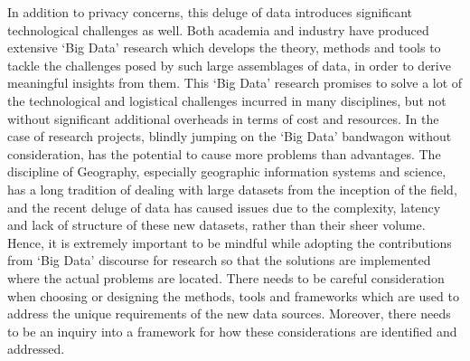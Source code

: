 In addition to privacy concerns, this deluge of data introduces significant technological challenges as well. 
Both academia and industry have produced extensive `Big Data' research which develops the theory, methods and tools to tackle the challenges posed by such large assemblages of data, in order to derive meaningful insights from them.
This `Big Data' research promises to solve a lot of the technological and logistical challenges incurred in many disciplines, but not without significant additional overheads in terms of cost and resources.
In the case of research projects, blindly jumping on the `Big Data' bandwagon without consideration, has the potential to cause more problems than advantages.
The discipline of Geography, especially geographic information systems and science, has a long tradition of dealing with large datasets from the inception of the field, and the recent deluge of data has caused issues due to the complexity, latency and lack of structure of these new datasets, rather than their sheer volume.
Hence, it is extremely important to be mindful while adopting the contributions from `Big Data' discourse for research so that the solutions are implemented where the actual problems are located.
There needs to be careful consideration when choosing or designing the methods, tools and frameworks which are used to address the unique requirements of the new data sources.
Moreover, there needs to be an inquiry into a framework for how these considerations are identified and addressed.

